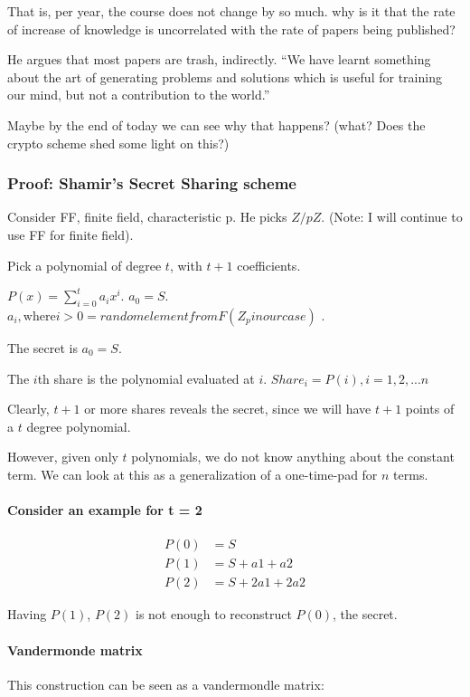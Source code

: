 That is, per year, the course does not change by so much. why is it that the rate of increase of knowledge is
uncorrelated with the rate of papers being published?

He argues that most papers are trash, indirectly. ``We have learnt something about the art of generating
problems and solutions which is useful for training our mind, but not a contribution to the world.''

Maybe by the end of today we can see why that happens? (what? Does the crypto scheme shed some light on this?)

\subsubsection{Proof: Shamir's Secret Sharing scheme}
Consider FF, finite field, characteristic p. He picks $Z/pZ$. (Note: I will continue to use FF for finite field).

Pick a polynomial of degree $t$, with $t + 1$ coefficients.

$P(x) = \sum_{i=0}^t a_i x^i$. $a_0 = S$. $a_i, \text{where} i > 0 = random element from F (Z_p in our case) $ .

The secret is $a_0 = S$.

The $i$th share is the polynomial evaluated at $i$.
$ Share_i = P(i), i = 1, 2, ... n$


Clearly, $t + 1$ or more shares reveals the secret, since we will have $t + 1$ points of a $t$ degree polynomial.

However, given only $t$ polynomials, we do not know anything about the constant term. We can look at this as a
generalization of a one-time-pad for $n$ terms.



\paragraph{Consider an example for t = 2}

\begin{align}
P(0) &= S \\
P(1) &= S + a1 + a2 \\
P(2) &= S + 2a1 + 2a2
\end{align}

Having $P(1)$, $P(2)$ is not enough to reconstruct $P(0)$, the secret.


\paragraph{Vandermonde matrix}
This construction can be seen as a vandermondle matrix:


